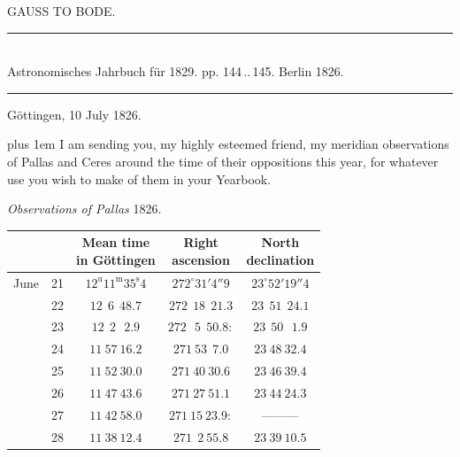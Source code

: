\clearpage
{}
\hypertarget{native-459-bode}{}
\begin{center}{\large GAUSS TO BODE.}\end{center}

\begin{center}
\rule{0.55\linewidth}{0.4pt}\\[2pt]
Astronomisches Jahrbuch für 1829. pp. 144\,..\,145. Berlin 1826.\\[2pt]
\rule{0.55\linewidth}{0.4pt}
\end{center}

\begin{flushright}
Göttingen, 10 July 1826.
\end{flushright}

\begingroup\rightskip=0pt plus 1em\relax
I am sending you, my highly esteemed friend, my meridian observations of Pallas and Ceres around the time of their oppositions this year, for whatever use you wish to make of them in your Yearbook.
\par\endgroup

\begin{center}
\emph{Observations of Pallas} 1826.
\end{center}

\begin{center}
\begingroup\small\setlength{\tabcolsep}{4pt}
\begin{tabular}{lr|c|c|c}
 & & \shortstack{Mean time\\in Göttingen} & \shortstack{Right\\ascension} & \shortstack{North\\declination} \\
\hline
June & 21 & $12^{\mathrm u}11^{\mathrm m}35^{\mathrm s}4$ & $272^\circ 31' 4''9$ & $23^\circ 52' 19''4$ \\
 & 22 & $12\ \ 6\ \ 48.7$ & $272\ \ 18\ \ 21.3$ & $23\ \ 51\ \ 24.1$ \\
 & 23 & $12\ \ 2\ \ \ 2.9$ & $272\ \ \ 5\ \ 50.8:$ & $23\ \ 50\ \ \ 1.9$ \\
 & 24 & $11\ 57\ 16.2$ & $271\ 53\ \ 7.0$ & $23\ 48\ 32.4$ \\
 & 25 & $11\ 52\ 30.0$ & $271\ 40\ 30.6$ & $23\ 46\ 39.4$ \\
 & 26 & $11\ 47\ 43.6$ & $271\ 27\ 51.1$ & $23\ 44\ 24.3$ \\
 & 27 & $11\ 42\ 58.0$ & $271\ 15\ 23.9:$ & ---\quad---\quad--- \\
 & 28 & $11\ 38\ 12.4$ & $271\ \ 2\ 55.8$ & $23\ 39\ 10.5$ \\
\end{tabular}
\endgroup
\end{center}

